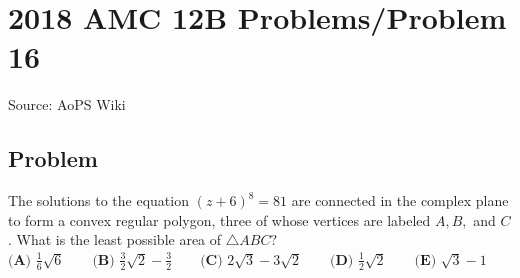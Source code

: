 \documentclass[12pt]{article}
\begin{document}
\section*{{2018 AMC 12B Problems/Problem 16}}
Source: AoPS Wiki

\subsection*{Problem}
The solutions to the equation $(z+6)^8=81$ are connected in the complex plane to form a convex regular polygon, three of whose vertices are labeled $A,B,$ and $C$ . What is the least possible area of $\triangle ABC?$ $\textbf{(A) } \frac{1}{6}\sqrt{6} \qquad \textbf{(B) } \frac{3}{2}\sqrt{2}-\frac{3}{2} \qquad \textbf{(C) } 2\sqrt3-3\sqrt2 \qquad \textbf{(D) } \frac{1}{2}\sqrt{2} \qquad \textbf{(E) } \sqrt 3-1$
\end{document}
